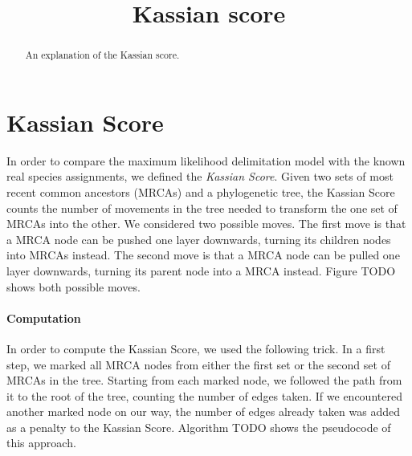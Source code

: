 \documentclass{llncs}
\begin{document}
\title{Kassian score}



\maketitle

\begin{abstract}
An explanation of the Kassian score.
\end{abstract}

\section{Kassian Score}
In order to compare the maximum likelihood delimitation model with the known real species assignments, we defined the \emph{Kassian Score}. Given two sets of most recent common ancestors (MRCAs) and a phylogenetic tree, the Kassian Score counts the number of movements in the tree needed to transform the one set of MRCAs into the other. We considered two possible moves. The first move is that a MRCA node can be pushed one layer downwards, turning its children nodes into MRCAs instead. The second move is that a MRCA node can be pulled one layer downwards, turning its parent node into a MRCA instead. Figure TODO shows both possible moves.

\paragraph{Computation}
In order to compute the Kassian Score, we used the following trick. In a first step, we marked all MRCA nodes from either the first set or the second set of MRCAs in the tree. Starting from each marked node, we followed the path from it to the root of the tree, counting the number of edges taken. If we encountered another marked node on our way, the number of edges already taken was added as a penalty to the Kassian Score. Algorithm TODO shows the pseudocode of this approach.



\end{document}
